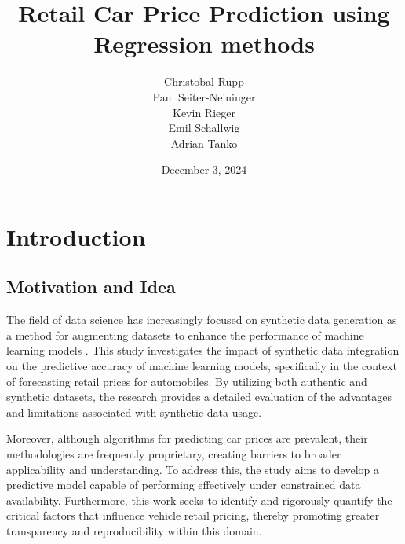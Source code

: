 \documentclass[a4paper,oneside,bibliography=totoc]{scrbook}
\renewcommand{\cleardoublepage}{}
\begin{document}
\frontmatter \subject{Project Paper} %
\title{Retail Car Price Prediction using Regression methods}
\author{Christobal Rupp\\
  		Paul Seiter-Neininger\\
  		Kevin Rieger\\
  		Emil Schallwig\\
  		Adrian Tanko} \date{December 3, 2024}
\publishers{{\small Submitted to}\\
  Data and Web Science Group\\
  Dr. Sven Hertling\\
  Franz Krause\\
  Andreea Iana\\
  University of Mannheim\\}
\maketitle

\mainmatter

\patchcmd{\chapter}{\cleardoublepage}{}{}{}
\chapter{Introduction}
\label{cha:introduction}

\section{Motivation and Idea}
\label{sec:motivationAndIdea}

The field of data science has increasingly focused on synthetic data generation as a method for augmenting datasets to enhance the performance of machine learning models \cite{neves2022}. This study investigates the impact of synthetic data integration on the predictive accuracy of machine learning models, specifically in the context of forecasting retail prices for automobiles. By utilizing both authentic and synthetic datasets, the research provides a detailed evaluation of the advantages and limitations associated with synthetic data usage.

Moreover, although algorithms for predicting car prices are prevalent, their methodologies are frequently proprietary, creating barriers to broader applicability and understanding. To address this, the study aims to develop a predictive model capable of performing effectively under constrained data availability. Furthermore, this work seeks to identify and rigorously quantify the critical factors that influence vehicle retail pricing, thereby promoting greater transparency and reproducibility within this domain.
\end{document}
